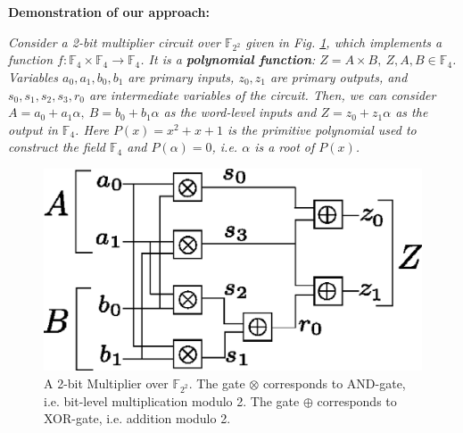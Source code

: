 \begin{Example}
\label{ex:twomult}
{\bf Demonstration of our approach:} {\it
Consider a 2-bit multiplier circuit over ${\mathbb{F}}_{2^2}$ given in
Fig. \ref{fig:mul2bit}, which implements a function $f: {\mathbb{F}}_4
\times {\mathbb{F}}_4 \rightarrow {\mathbb{F}}_4$. It is a
{\bf polynomial function}: $Z = A \times B, ~Z, A, B \in
{\mathbb{F}}_4$. Variables $a_0, a_1, b_0, b_1$ are primary inputs,
$z_0, z_1$ are primary outputs, and $s_0, s_1, s_2, s_3, r_0$ are
intermediate variables of the circuit. 
Then, we can consider $A = a_0 + a_1 \alpha, ~B = b_0 +
b_1 \alpha$ as the word-level inputs and $Z = z_0 + z_1 \alpha$ 
as the output in ${\mathbb{F}}_4$. Here $P(x) = x^2 + x + 1$ is the primitive
polynomial used to construct the field ${\mathbb{F}}_4$ and $P(\alpha)
= 0$, i.e. $\alpha$ is a root of $P(x)$. 
\begin{figure}[htb]
\centerline{
\includegraphics[scale=0.3]{2bitmult.eps}
}
\caption{\small A 2-bit Multiplier over ${\mathbb{F}}_{2^2}$. The gate
  $\otimes$ corresponds to AND-gate, i.e. bit-level multiplication
  modulo 2. The gate $\oplus$ corresponds to XOR-gate, i.e. addition
  modulo 2.} 
\label{fig:mul2bit}
\end{figure}

}
\end{Example}
